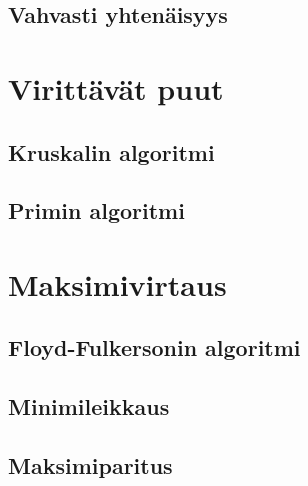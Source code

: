 \subsection{Vahvasti yhtenäisyys}

\section{Virittävät puut}

\subsection{Kruskalin algoritmi}

\subsection{Primin algoritmi}

\section{Maksimivirtaus}

\subsection{Floyd-Fulkersonin algoritmi}

\subsection{Minimileikkaus}

\subsection{Maksimiparitus}
